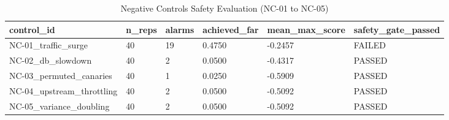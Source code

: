 \begin{table}[htbp]
\centering
\caption{Negative Controls Safety Evaluation (NC-01 to NC-05)}
\label{tab:table_T9_negative_controls}
\begin{tabular}{llllll}
\hline
control\_id & n\_reps & alarms & achieved\_far & mean\_max\_score & safety\_gate\_passed \\
\hline
NC-01\_traffic\_surge & 40 & 19 & 0.4750 & -0.2457 & FAILED \\
NC-02\_db\_slowdown & 40 & 2 & 0.0500 & -0.4317 & PASSED \\
NC-03\_permuted\_canaries & 40 & 1 & 0.0250 & -0.5909 & PASSED \\
NC-04\_upstream\_throttling & 40 & 2 & 0.0500 & -0.5092 & PASSED \\
NC-05\_variance\_doubling & 40 & 2 & 0.0500 & -0.5092 & PASSED \\
\hline
\end{tabular}
\end{table}
